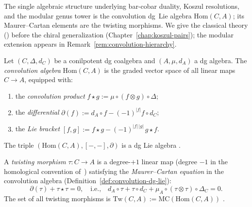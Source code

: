The single algebraic structure underlying bar-cobar duality, Koszul
resolutions, and the modular genus tower is the convolution dg~Lie
algebra $\mathrm{Hom}(C, A)$; its Maurer--Cartan elements are the
twisting morphisms.  We give the classical theory
(\cite[\S2.1--2.3]{LV12}) before the chiral generalization
(Chapter~\ref{chap:koszul-pairs}); the modular extension appears
in Remark~\ref{rem:convolution-hierarchy}.

\begin{definition}
\label{def:convolution-dg-lie}
Let $(C, \Delta, d_C)$ be a conilpotent dg coalgebra and
$(A, \mu, d_A)$ a dg algebra.  The \emph{convolution algebra}
$\mathrm{Hom}(C, A)$ is the graded vector space of all linear maps
$C \to A$, equipped with:
\begin{enumerate}[label=\textup{(\roman*)}]
\item the \emph{convolution product}
  $f \star g := \mu \circ (f \otimes g) \circ \Delta$;
\item the \emph{differential}
  $\partial(f) := d_A \circ f - (-1)^{|f|} f \circ d_C$;
\item the \emph{Lie bracket}
  $[f, g] := f \star g - (-1)^{|f|\,|g|}\, g \star f$.
\end{enumerate}
The triple $(\mathrm{Hom}(C, A), [-, -], \partial)$
is a dg Lie algebra \cite[Proposition~2.1.1]{LV12}.
\end{definition}

\begin{definition}
\label{def:twisting-morphism}
A \emph{twisting morphism} $\tau\colon C \to A$ is a
degree-$+1$ linear map (degree $-1$ in the homological convention
of~\cite{LV12}) satisfying the \emph{Maurer--Cartan equation} in
the convolution algebra
(Definition~\ref{def:convolution-dg-lie}):
\begin{equation}\label{eq:twisting-mc}
\partial(\tau) + \tau \star \tau = 0,
\quad\text{i.e.,}\quad
d_A \circ \tau + \tau \circ d_C
+ \mu_A \circ (\tau \otimes \tau) \circ \Delta_C = 0.
\end{equation}
The set of all twisting morphisms is
$\mathrm{Tw}(C, A) := \mathrm{MC}(\mathrm{Hom}(C, A))$
\cite[\S2.1]{LV12}.
\end{definition}

